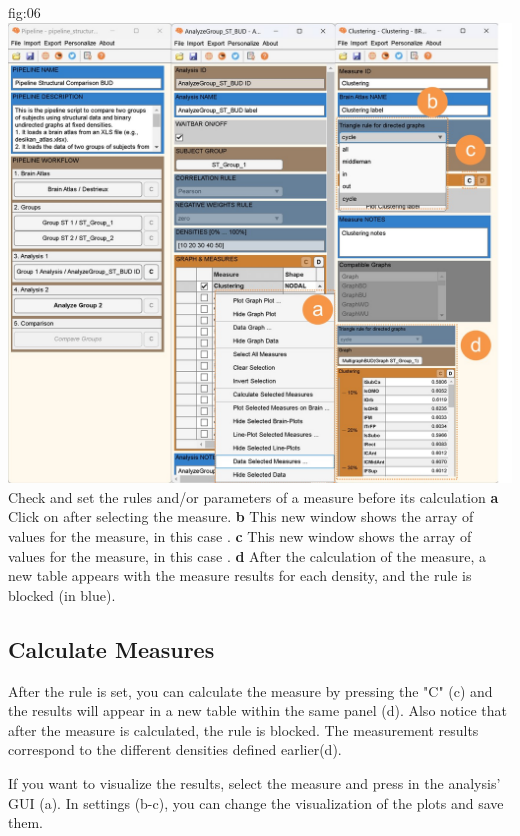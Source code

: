 \documentclass[justified]{tufte-handout}
\begin{document}
 {fig:06}
 {
 	\includegraphics{fig06.jpg}
 }
 {Check and set the rules and/or parameters of a measure before its calculation}
 {
 	{\bf a} Click on  after selecting the measure.
 	{\bf b} This new window shows the array of values for the measure, in this case .
 	{\bf c} This new window shows the array of values for the measure, in this case .
 	{\bf d} After the calculation of the measure, a new table appears with the measure results for each density, and the rule is blocked (in blue).
 }
 
\subsection{Calculate Measures}
After the rule is set, you can calculate the measure by pressing the "C" (c) and the results will appear in a new table within the same panel (d). Also notice that after the measure is calculated, the rule is blocked. The measurement results correspond to the different densities defined earlier(d).
 
 If you want to visualize the results, select the measure and press  in the analysis' GUI (a). In settings (b-c), you can change the visualization of the plots and save them. 
 
\end{document}
